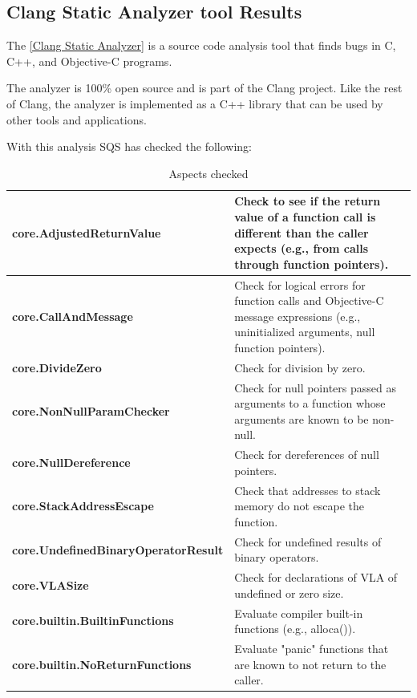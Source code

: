 \subsection{Clang Static Analyzer tool Results}
The \href{http://clang-analyzer.llvm.org/}{[Clang Static Analyzer]} is a source code analysis tool that finds bugs in C, C++, and Objective-C programs.

The analyzer is 100\% open source and is part of the Clang project. Like the rest of Clang, the analyzer is implemented as a C++ library that can be used by other tools and applications.

With this analysis SQS has checked the following:

{\footnotesize\sffamily\centering
  \begin{longtable}{||p{}|p{}||}
  \caption{Aspects checked}\\
    \hline\hline
    \hline\hline
    \endhead
    \hline\hline
    \endfoot
    \textbf{core.AdjustedReturnValue}
& Check to see if the return value of a function call is different than the caller expects (e.g., from calls through function pointers).
    \\
    \hline
    \textbf{core.CallAndMessage}
& Check for logical errors for function calls and Objective-C message expressions (e.g., uninitialized arguments, null function pointers).
    \\
    \hline
    \textbf{core.DivideZero}
& Check for division by zero.
    \\
    \hline
    \textbf{core.NonNullParamChecker}
& Check for null pointers passed as arguments to a function whose arguments are known to be non-null.
    \\
    \hline
    \textbf{core.NullDereference}
& Check for dereferences of null pointers.
    \\
    \hline
    \textbf{core.StackAddressEscape}
& Check that addresses to stack memory do not escape the function.
    \\
    \hline
    \textbf{core.UndefinedBinaryOperatorResult}
& Check for undefined results of binary operators.
    \\
    \hline
    \textbf{core.VLASize}
& Check for declarations of VLA of undefined or zero size.
    \\
    \hline
    \textbf{core.builtin.BuiltinFunctions}
& Evaluate compiler built-in functions (e.g., alloca()).
    \\
    \hline
    \textbf{core.builtin.NoReturnFunctions}
& Evaluate "panic" functions that are known to not return to the caller.

\end{longtable}}
